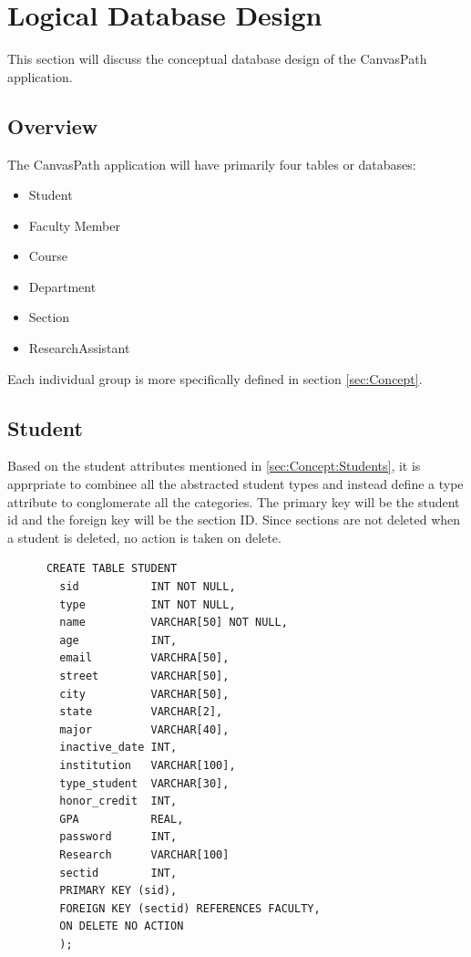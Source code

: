 \documentclass{article}
\begin{document}
  \section{Logical Database Design}
    This section will discuss the conceptual database design of the CanvasPath application.

  \subsection{Overview}
    The CanvasPath application will have primarily four tables or databases:
    \begin{itemize}
      \item Student
      \item Faculty Member
      \item Course
      \item Department
      \item Section
      \item ResearchAssistant
    \end{itemize}
    Each individual group is more specifically defined in section \ref{sec:Concept}.

  \subsection{Student}
    Based on the student attributes mentioned in \ref{sec:Concept:Students}, it is apprpriate to combinee all the abstracted student types and instead define a type attribute to conglomerate all the categories.  The primary key will be the student id and the foreign key will be the section ID.  Since sections are not deleted when a student is deleted, no action is taken on delete.

    \begin{lstlisting}
      CREATE TABLE STUDENT
        sid           INT NOT NULL,
        type          INT NOT NULL,
        name          VARCHAR[50] NOT NULL,
        age           INT,
        email         VARCHRA[50],
        street        VARCHAR[50],
        city          VARCHAR[50],
        state         VARCHAR[2],
        major         VARCHAR[40],
        inactive_date INT,
        institution   VARCHAR[100],
        type_student  VARCHAR[30],
        honor_credit  INT,
        GPA           REAL,
        password      INT,
        Research      VARCHAR[100]
        sectid        INT,
        PRIMARY KEY (sid),
        FOREIGN KEY (sectid) REFERENCES FACULTY,
        ON DELETE NO ACTION
        );
    \end{lstlisting}
\end{document}
